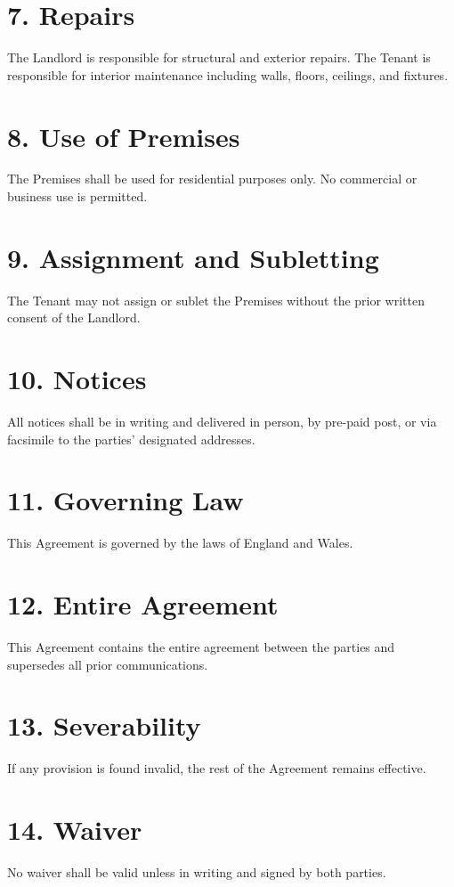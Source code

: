 \documentclass[12pt,a4paper]{article}
\begin{document}
\section*{7. Repairs}
The Landlord is responsible for structural and exterior repairs. The Tenant is responsible for interior maintenance including walls, floors, ceilings, and fixtures.

\section*{8. Use of Premises}
The Premises shall be used for residential purposes only. No commercial or business use is permitted.

\section*{9. Assignment and Subletting}
The Tenant may not assign or sublet the Premises without the prior written consent of the Landlord.

\section*{10. Notices}
All notices shall be in writing and delivered in person, by pre-paid post, or via facsimile to the parties' designated addresses.

\section*{11. Governing Law}
This Agreement is governed by the laws of England and Wales.

\section*{12. Entire Agreement}
This Agreement contains the entire agreement between the parties and supersedes all prior communications.

\section*{13. Severability}
If any provision is found invalid, the rest of the Agreement remains effective.

\section*{14. Waiver}
No waiver shall be valid unless in writing and signed by both parties.
\end{document}
